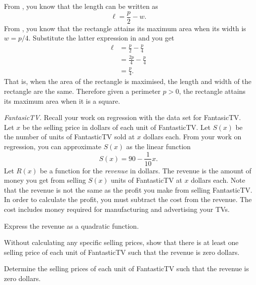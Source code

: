 \documentclass[a4paper,oneside,12pt]{article}
\begin{document}
\begin{problem}
{\begin{solution}
From , you know that the length can
be written as
\begin{equation}
\label{eqn:rectangle_length_as_width_and_perimeter}
\ell
=
\frac{p}{2} - w.
\end{equation}
From , you know that the
rectangle attains its maximum area when its width is $w = p / 4$.
Substitute the latter expression in
 and you get
\begin{align*}
\ell
&=
\frac{p}{2} - \frac{p}{4} \\[4pt]
&=
\frac{2p}{4} - \frac{p}{4} \\[4pt]
&=
\frac{p}{4}.
\end{align*}
That is, when the area of the rectangle is maximised, the length and
width of the rectangle are the same.  Therefore given a perimeter
$p > 0$, the rectangle attains its maximum area when it is a square.
\end{solution}
}{}

\item\emph{FantasicTV.}
  Recall your work on regression with the data set for FantasicTV.
  Let $x$ be the selling price in dollars of each unit of FantasticTV.
  Let $S(x)$ be the number of units of FantasticTV sold at $x$ dollars
  each.  From your work on regression, you can approximate $S(x)$ as
  the linear function
  \[
  S(x)
  =
  90 - \frac{1}{10}x.
  \]
  Let $R(x)$ be a function for the \emph{revenue} in dollars.  The
  revenue is the amount of money you get from selling $S(x)$ units of
  FantasticTV at $x$ dollars each.  Note that the revenue is not the
  same as the profit you make from selling FantasticTV.  In order to
  calculate the profit, you must subtract the cost from the revenue.
  The cost includes money required for manufacturing and advertising
  your TVs.
  \begin{packedenum}
  \item\label{subprob:FantasticTV_total_revenue}
    Express the revenue as a quadratic function.

  \item\label{subprob:FantasticTV_zero_revenue_exist}
    Without calculating any specific selling prices, show that there
    is at least one selling price of each unit of FantasticTV such
    that the revenue is zero dollars.

  \item\label{subprob:FantasticTV_zero_revenue}
    Determine the selling prices of each unit of FantasticTV such that
    the revenue is zero dollars.


\end{packedenum}
\end{problem}
\end{document}
